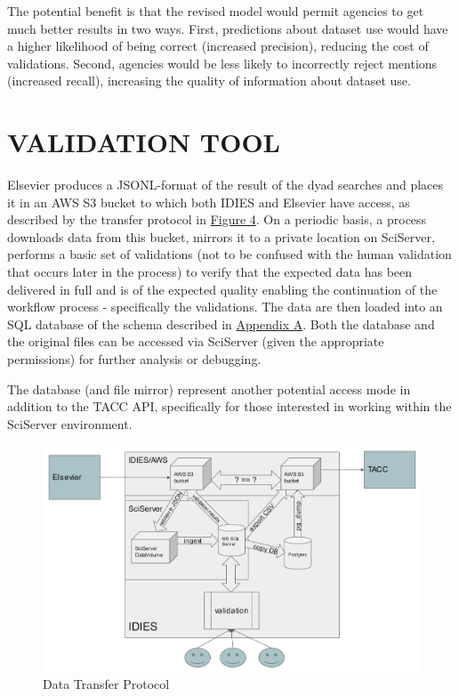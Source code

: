 \documentclass[titlepage, 11pt]{article}
\begin{document}
{The potential benefit is that the revised model would permit agencies to get much better results in two ways.  First, predictions about dataset use would have a higher likelihood of being correct (increased precision), reducing the cost of validations. Second, agencies would be less likely to incorrectly reject mentions (increased recall), increasing the quality of information about dataset use.



\section{VALIDATION TOOL}
\label{sec:Chapter6}
Elsevier produces a JSONL-format of the result of the dyad searches and places it in an AWS S3 bucket to which both IDIES and Elsevier have access, as described by the transfer protocol in \hyperref[fig:process]{Figure 4}. On a periodic basis, a process downloads data from this bucket, mirrors it to a private location on SciServer, performs a basic set of validations (not to be confused with the human validation that occurs later in the process) to verify that the expected data has been delivered in full and is of the expected quality enabling the continuation of the workflow process - specifically the validations. The data are then loaded into an SQL database of the schema described in \hyperref[sec:APPENDIXA]{Appendix A}. Both the database and the original files can be accessed via SciServer (given the appropriate permissions) for further analysis or debugging. 

The database (and file mirror) represent another potential access mode in addition to the TACC API, specifically for those interested in working within the SciServer environment.

\begin{figure}
  \includegraphics[scale=0.40]{datatransfer.png}
  \caption{Data Transfer Protocol}
  \label{fig:datatransfer}
\end{figure}

}
\end{document}
